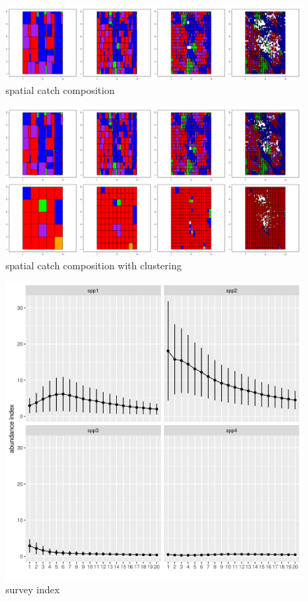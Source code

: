 \documentclass[review]{elsarticle}
\begin{document}
\begin{figure}[!ht]
	\includegraphics[width = \linewidth]{../tests/plots/catch_comp}
		\caption{spatial catch composition}
\end{figure}	

\begin{figure}[!ht]
	\includegraphics[width = \linewidth]{../tests/plots/catch_comp_clusters}
		\caption{spatial catch composition with clustering}
\end{figure}	

\begin{figure}[!ht]
	\includegraphics[width = \linewidth]{../tests/plots/survey_index}
		\caption{survey index}
\end{figure}	
\end{document}
